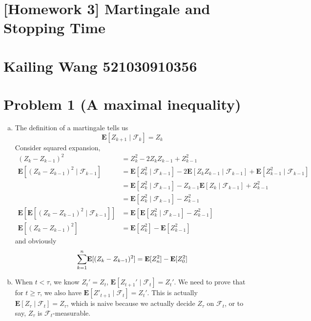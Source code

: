 \documentclass{article}
\theoremstyle{definition}
\begin{document}
	
	\section*{\LARGE [Homework 3] Martingale and Stopping Time}
	\section*{\large Kailing Wang 521030910356}
	
	\section*{Problem 1 (A maximal inequality)}
	\begin{enumerate}[(a)]
		\item
		The definition of a martingale tells us 
		\begin{equation}
			\mathbf E [Z_{k+1}\mid \mathcal F_k] = Z_k
		\end{equation}
		Consider squared expansion,
		\begin{equation}
			\begin{aligned}
				(Z_k-Z_{k-1})^2 & = Z_k^2-2Z_kZ_{k-1}+Z_{k-1}^2 \\
				\mathbf E[(Z_k-Z_{k-1})^2\mid \mathcal F_{k-1}] & = \mathbf E[Z_k^2 \mid \mathcal F_{k-1}]-2\mathbf E[Z_kZ_{k-1}\mid \mathcal F_{k-1}]+\mathbf E[Z_{k-1}^2\mid \mathcal F_{k-1}]\\
				& = \mathbf E[Z_k^2 \mid \mathcal F_{k-1}]-Z_{k-1}\mathbf E[Z_k\mid \mathcal F_{k-1}]+
				 Z_{k-1}^2\\
				& = \mathbf E[Z_k^2 \mid \mathcal F_{k-1}] - Z_{k-1}^2\\
				\mathbf E [\mathbf E[(Z_k-Z_{k-1})^2\mid \mathcal F_{k-1}]] & = \mathbf E [\mathbf E[Z_k^2 \mid \mathcal F_{k-1}] - Z_{k-1}^2]\\
				\mathbf E [(Z_k-Z_{k-1})^2] & = \mathbf E [Z_k^2] - \mathbf E[Z_{k-1}^2]
			\end{aligned}
		\end{equation}
		and obviously 
		\begin{equation}
			\overunderset{n}{k=1}{\sum}\mathbf E [(Z_k-Z_{k-1})^2] = \mathbf E [Z_n^2] - \mathbf E[Z_0^2]
		\end{equation}
		\item When $t<\tau$, we know $Z_t' = Z_t$, $\mathbf E [Z_{t+1}'\mid \mathcal F_t] = Z_t'$. We need to prove that for $t\geq \tau$, we also have $\mathbf E [Z'_{t+1}\mid \mathcal F_t] = Z_t'$. This is actually $\mathbf E [Z_\tau\mid \mathcal F_t] = Z_\tau$, which is naive because we actually decide $Z_\tau$ on $\mathcal F_t$, or to say, $Z_\tau$ is $\mathcal F_t$-measurable.

\end{enumerate}
\end{document}
